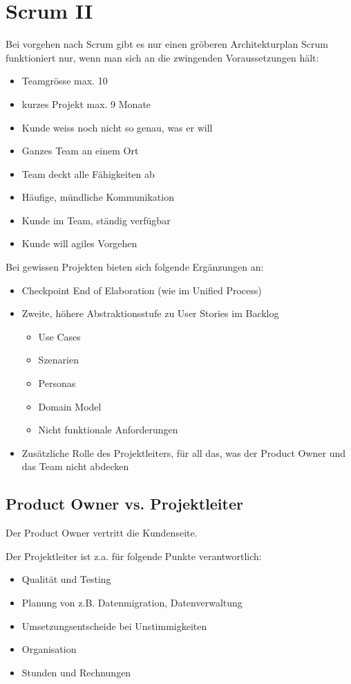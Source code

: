 \section{Scrum II}

Bei vorgehen nach Scrum gibt es nur einen gröberen Architekturplan 
Scrum funktioniert nur, wenn man sich an die zwingenden Voraussetzungen hält:

\begin{itemize}
\item Teamgrösse max. 10
\item kurzes Projekt max. 9 Monate
\item Kunde weiss noch nicht so genau, was er will
\item Ganzes Team an einem Ort
\item Team deckt alle Fähigkeiten ab
\item Häufige, mündliche Kommunikation
\item Kunde im Team, ständig verfügbar
\item Kunde will agiles Vorgehen
\end{itemize}

Bei gewissen Projekten bieten sich folgende Ergänzungen an:

\begin{itemize}
	\item Checkpoint End of Elaboration (wie im Unified Process)
	\item Zweite, höhere Abstraktionsstufe zu User Stories im Backlog
		\begin{itemize}
			\item Use Cases
			\item Szenarien
			\item Personas
			\item Domain Model
			\item Nicht funktionale Anforderungen
		\end{itemize}
	\item Zusätzliche Rolle des Projektleiters, für all das, was der Product Owner und das Team nicht abdecken
\end{itemize}

\subsection{Product Owner vs. Projektleiter}

Der Product Owner vertritt die Kundenseite.

Der Projektleiter ist z.a. für folgende Punkte verantwortlich:
\begin{itemize}
	\item Qualität und Testing
	\item Planung von z.B. Datenmigration, Datenverwaltung
	\item Umsetzungsentscheide bei Unstimmigkeiten
	\item Organisation
	\item Stunden und Rechnungen
\end{itemize}

